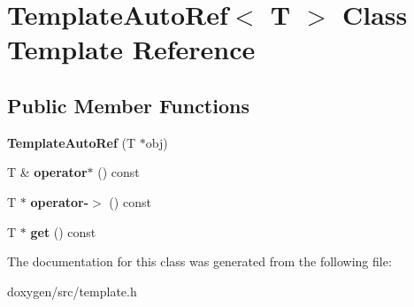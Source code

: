 \hypertarget{class_template_auto_ref}{}\section{Template\+Auto\+Ref$<$ T $>$ Class Template Reference}
\label{class_template_auto_ref}
\subsection*{Public Member Functions}
\begin{DoxyCompactItemize}
\item 
\mbox{\label{class_template_auto_ref_a4b5d36bdd4e44a1e4588dcb69f054563}} 
{\bfseries Template\+Auto\+Ref} (T $\ast$obj)
\item 
\mbox{\label{class_template_auto_ref_a1485a770ff558016ed8dec6f5996c94b}} 
T \& {\bfseries operator$\ast$} () const
\item 
\mbox{\label{class_template_auto_ref_a7872dd06ccba0498870a31899198d91b}} 
T $\ast$ {\bfseries operator-\/$>$} () const
\item 
\mbox{\label{class_template_auto_ref_a69249448b62b3de66bb139887be322ea}} 
T $\ast$ {\bfseries get} () const
\end{DoxyCompactItemize}


The documentation for this class was generated from the following file\+:\begin{DoxyCompactItemize}
\item 
doxygen/src/template.\+h\end{DoxyCompactItemize}
